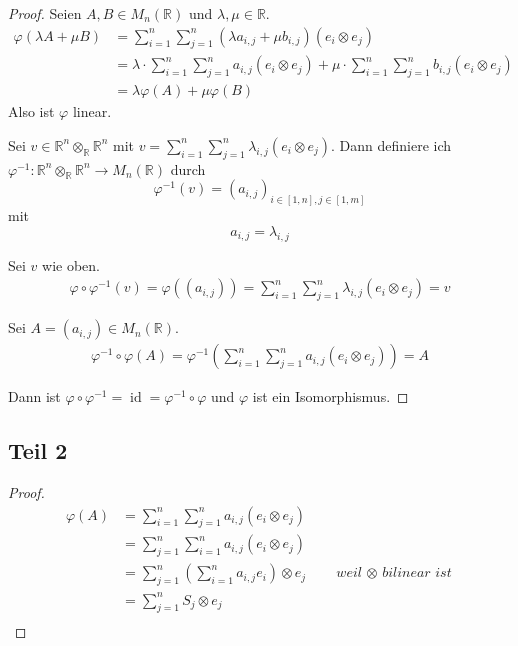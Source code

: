 \documentclass[10pt,a4paper]{article}
\DeclareMathOperator{\id}{id}
\begin{document}
\begin{proof}
Seien $A, B \in M_{n}(\mathbb{R})$ und $\lambda, \mu \in \mathbb{R}$.
\begin{align*}
\varphi(\lambda A + \mu B) & = \sum_{i = 1}^{n} \sum_{j = 1}^{n} (\lambda a_{i, j} + \mu b_{i, j}) (e_{i} \otimes e_{j})\\
& = \lambda \cdot \sum_{i = 1}^{n} \sum_{j = 1}^{n} a_{i, j} (e_{i} \otimes e_{j}) + \mu \cdot \sum_{i = 1}^{n} \sum_{j = 1}^{n} b_{i, j} (e_{i} \otimes e_{j})\\
& = \lambda \varphi(A) + \mu \varphi(B)
\end{align*}
Also ist $\varphi$ linear.

Sei $v \in \mathbb{R}^{n} \otimes_{\mathbb{R}} \mathbb{R}^{n}$ mit $v = \sum_{i = 1}^{n} \sum_{j = 1}^{n} \lambda_{i, j} (e_{i} \otimes e_{j})$.
Dann definiere ich $\varphi^{-1}: \mathbb{R}^{n} \otimes_{\mathbb{R}} \mathbb{R}^{n} \rightarrow M_{n}(\mathbb{R})$ durch
\begin{equation}
\varphi^{-1}(v) = (a_{i, j})_{i \in [1, n], j \in [1, m]}
\end{equation}
mit
\begin{equation}
a_{i, j} = \lambda_{i, j}
\end{equation}

Sei $v$ wie oben.
\begin{align*}
\varphi \circ \varphi^{-1}(v) = \varphi((a_{i, j})) = \sum_{i = 1}^{n} \sum_{j = 1}^{n} \lambda_{i, j} (e_{i} \otimes e_{j}) = v
\end{align*}

Sei $A = (a_{i, j}) \in M_{n}(\mathbb{R})$.
\begin{align*}
\varphi^{-1} \circ \varphi(A) = \varphi^{-1}(\sum_{i = 1}^{n} \sum_{j = 1}^{n} a_{i, j} (e_{i} \otimes e_{j})) = A
\end{align*}

Dann ist $\varphi \circ \varphi^{-1} = \id = \varphi^{-1} \circ \varphi$ und $\varphi$ ist ein Isomorphismus.
\end{proof}

\subsection*{Teil 2}

\begin{proof}
\begin{align*}
\varphi(A) & = \sum_{i = 1}^{n} \sum_{j = 1}^{n} a_{i, j} (e_{i} \otimes e_{j})\\
& = \sum_{j = 1}^{n} \sum_{i = 1}^{n} a_{i, j} (e_{i} \otimes e_{j})\\
& = \sum_{j = 1}^{n} \left( \sum_{i = 1}^{n} a_{i, j} e_{i} \right) \otimes e_{j} \qquad \textit{weil $\otimes$ bilinear ist}\\
& = \sum_{j = 1}^{n} S_{j} \otimes e_{j}\\
\end{align*}
\end{proof}
\end{document}
